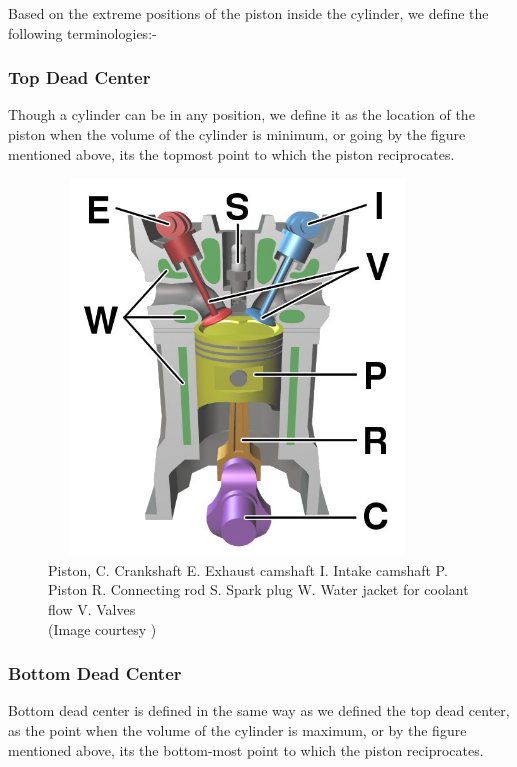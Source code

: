\documentclass[11pt]{article}
\begin{document}
\begin{flushleft}
Based on the extreme positions of the piston inside the cylinder, we define the following terminologies:- \\[-0.2in]
\subsubsection{Top Dead Center}
Though a cylinder can be in any position, we define it as the location of the piston when the volume of the cylinder is minimum, or going by the figure mentioned above, its the topmost point to which the piston reciprocates.

\begin{center}
        \begin{figure}[h]
        \centering
          \includegraphics[width=100mm, height=100mm]{piston.jpg}
          \caption{Piston, C. Crankshaft E. Exhaust camshaft I. Intake camshaft P. Piston R. Connecting rod S. Spark plug W. Water jacket for coolant flow V. Valves\\ (Image courtesy \cite{ref9})
          }
          \label{fig:Piston}
        \end{figure}
\end{center}

\subsubsection{Bottom Dead Center}
Bottom dead center is defined in the same way as we defined the top dead center, as the point when the volume of the cylinder is maximum, or by the figure mentioned above, its the bottom-most point to which the piston reciprocates.

\end{flushleft}
\end{document}
